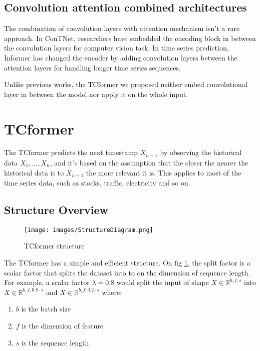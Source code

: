 \documentclass[10pt,journal,compsoc]{IEEEtran}
\begin{document}
\subsection{Convolution attention combined architectures}

The combination of convolution layers with attention mechanism isn't a rare approach. In ConTNet, researchers have embedded the encoding block in between the convolution layers \cite{yan2021contnetuseconvolutiontransformer} for computer vision task. In time series prediction, Informer \cite{informer} has changed the encoder by adding convolution layers between the attention layers for handling longer time series sequences. 

Unlike previous works, the TCformer we proposed neither embed convolutional layer in between the model nor apply it on the whole input. 

\section{TCformer}

The TCformer predicts the next timestamp $X_{n+1}$ by observing the historical data $X_1,..., X_n$, and it's based on the assumption that the closer the nearer the historical data is to $X_{n+1}$ the more relevant it is. This applies to most of the time series data, such as stocks, traffic, electricity and so on. 

\subsection{Structure Overview}

\begin{figure}[h]
    \centering
    \texttt{[image: images/StructureDiagram.png]}
    \caption{TCformer structure}
    \label{fig:TCformer-structure}
\end{figure}

The TCformer has a simple and efficient structure. On fig \ref{fig:TCformer-structure}, the split factor is a scalar factor that splits the dataset into to on the dimension of sequence length. For example, a scalar factor $\lambda=0.8$ would split the input of shape $X\in \mathbb{R}^{b,f,s}$ into $X\in \mathbb{R}^{b,f,0.8\cdot s}$ and $X\in \mathbb{R}^{b,f,0.2\cdot s}$ where:

\begin{enumerate}
    \item $b$ is the batch size
    \item $f$ is the dimension of feature
    \item $s$ is the sequence length
\end{enumerate}
\end{document}
